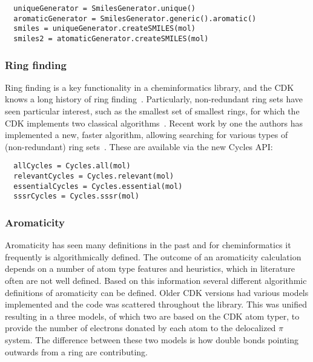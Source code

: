 \documentclass[10pt]{bmcart}
\begin{document}
\begin{verbatim}
  uniqueGenerator = SmilesGenerator.unique()
  aromaticGenerator = SmilesGenerator.generic().aromatic()
  smiles = uniqueGenerator.createSMILES(mol)
  smiles2 = atomaticGenerator.createSMILES(mol)
\end{verbatim}


  \subsubsection*{Ring finding}

  Ring finding is a key functionality in a cheminformatics library, and the CDK
  knows a long history of ring finding~\cite{May2014}. Particularly, non-redundant
  ring sets have seen particular interest, such as the smallest set of smallest
  rings, for which the CDK implements two classical algorithms~\cite{Figueras1996,Berger2004}.
  Recent work by one the authors has implemented a new, faster algorithm, allowing
  searching for various types of (non-redundant) ring sets~\cite{May2014}. These
  are available via the new Cycles API:

\begin{verbatim}
  allCycles = Cycles.all(mol)
  relevantCycles = Cycles.relevant(mol)
  essentialCycles = Cycles.essential(mol)
  sssrCycles = Cycles.sssr(mol)
\end{verbatim}

  \subsubsection*{Aromaticity}

  Aromaticity has seen many definitions in the past and for cheminformatics it
  frequently is algorithmically defined. The outcome of an aromaticity calculation
  depends on a number of atom type features and heuristics, which in literature
  often are not well defined. Based on this information several different
  algorithmic definitions of aromaticity can be defined. Older CDK versions had
  various models implemented and the code was scattered throughout the library.
  This was unified resulting in a three models, of which two are based on the
  CDK atom typer, to provide the number of electrons donated by each atom to
  the delocalized $\pi$ system. The difference between these two models is
  how double bonds pointing outwards from a ring are contributing.
\end{document}

